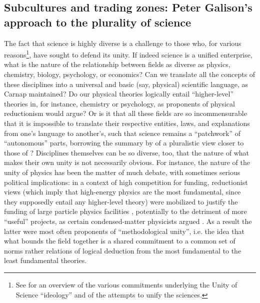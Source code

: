 \documentclass[smallextended]{svjour3}
\begin{document}
\subsection{Subcultures and trading zones: Peter Galison's approach to the plurality of science}\label{section:galison}

The fact that science is highly diverse is a challenge to those who, for various reasons\footnote{See \citealt{Hacking1996,Bechtel2007} for an overview of the various commitments underlying the Unity of Science ``ideology'' and of the attempts to unify the sciences.}, have sought to defend its unity. If 
indeed science is a unified enterprise, what is the nature of the relationship between fields as diverse as physics, chemistry, biology, psychology, or economics? Can we translate all the concepts of these disciplines into a universal and basic (say, physical) scientific language, as Carnap maintained? Do our physical theories logically entail ``higher-level'' theories in, for instance, chemistry or psychology, as proponents of physical reductionism would argue? Or is it that all these fields are so incommensurable that it is impossible to translate their respective entities, laws, and explanations from one's language to another's, such that science remains a ``patchwork'' of ``autonomous'' parts, borrowing the summary by \citet{Ruphy2016} of a pluralistic view closer to those of \citet{Suppes1978,Dupre1983,Cartwright1999}? Disciplines themselves can be so diverse, too, that the nature of what makes their own unity is not necessarily obvious. For instance, the nature of the unity of physics has been the matter of much debate, with sometimes serious political implications: in a context of high competition for funding, reductionist views (which imply that high-energy physics are the most fundamental, since they supposedly entail any higher-level theory) were mobilized to justify the funding of large particle physics facilities \citep{Cat1998}, potentially to the detriment of more ``useful'' projects, as certain condensed-matter physicists argued \citep{martin2018solid}. As a result the latter were most often proponents of ``methodological unity'', i.e. the idea that what bounds the field together is a shared commitment to a common set of norms rather relations of logical deduction from the most fundamental to the least fundamental theories.
\end{document}

